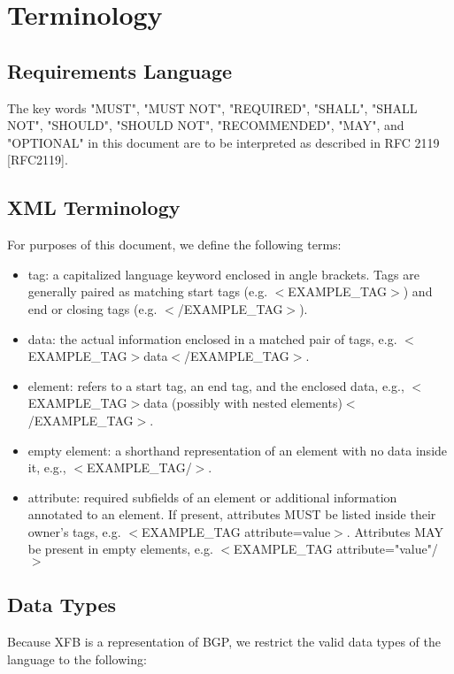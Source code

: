 \documentclass{article}
\begin{document}
\section{Terminology}
\label{TERMS}
\subsection{Requirements Language}
\label{REQUIRED}
The key words "MUST", "MUST NOT", "REQUIRED", "SHALL", "SHALL NOT", "SHOULD", "SHOULD NOT", "RECOMMENDED", "MAY", and "OPTIONAL" in this document are to be interpreted as described in RFC 2119 [RFC2119].

\subsection{XML Terminology}
\label{XML}
For purposes of this document, we define the following terms:

\begin{itemize}
\item{tag: a capitalized language keyword enclosed in angle brackets.  Tags are generally paired as matching start tags (e.g. $<$EXAMPLE_TAG$>$) and end or closing tags (e.g. $<$/EXAMPLE_TAG$>$).}
\item{data: the actual information enclosed in a matched pair of tags, e.g. $<$EXAMPLE_TAG$>$data$<$/EXAMPLE_TAG$>$.}
\item{element: refers to a start tag, an end tag, and the enclosed data, e.g., $<$EXAMPLE_TAG$>$data (possibly with nested elements)$<$/EXAMPLE_TAG$>$.}
\item{empty element: a shorthand representation of an element with no data inside it, e.g., $<$EXAMPLE_TAG/$>$.}
\item{attribute: required subfields of an element or additional information annotated to an element.  
If present, attributes MUST be listed inside their owner's tags, e.g. $<$EXAMPLE_TAG attribute=value$>$.
Attributes MAY be present in empty elements, e.g. $<$EXAMPLE_TAG attribute="value"/$>$}
\end{itemize}

\subsection{Data Types}
\label{TYPES}
Because XFB is a representation of BGP, we restrict the valid data types of the language to the following:
\end{document}
